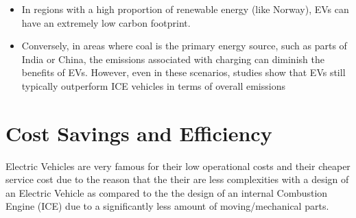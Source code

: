 \documentclass[a4paper,12pt]{report}
\begin{document}
\begin{center}
\end{center}

\begin{itemize}
    \item In regions with a high proportion of renewable energy (like Norway), EVs can have an extremely low carbon footprint.
    \item Conversely, in areas where coal is the primary energy source, such as parts of India or China, the emissions associated with charging can diminish the benefits of EVs. However, even in these scenarios, studies show that EVs still typically outperform ICE vehicles in terms of overall emissions
\end{itemize}

\section{Cost Savings and Efficiency}
Electric Vehicles are very famous for their low operational costs and their cheaper service cost due to the reason that the their are less complexities with a design of an Electric Vehicle as compared to the the design of an internal Combustion Engine (ICE) due to a significantly less amount of moving/mechanical parts. 
\end{document}

